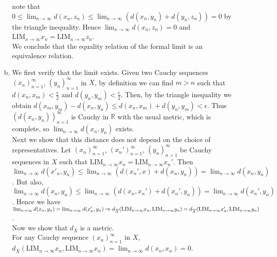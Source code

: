 \documentclass[A4paper,12pt]{article}
\theoremstyle{definition}
\numberwithin{equation}{section}
\begin{document}
\begin{enumerate}[(1)]
\begin{enumerate}[(a)]
                note that $0 \le \lim_{n \rightarrow \infty} d(x_n,z_n) \le \lim_{n \rightarrow \infty} (d(x_n, y_n)+ d(y_n, z_n)) = 0$ by the triangle inequality.
                Hence $\lim_{x  \rightarrow \infty } d(x_n, z_n)= 0$ and $\mathrm{LIM}_{x \rightarrow \infty} x_n  = \mathrm{LIM}_{n \rightarrow \infty} z_n$.
            \\We conclude that the equality relation of the formal limit is an equivalence relation.
            \item
                We first verify that the limit exists. 
                Given two Cauchy sequences $(x_n)_{n=1}^\infty$, $(y_n)_{n=1}^\infty$ in $X$, by definition we can find $m>n$ such that $d(x_n, x_m)<\frac{\epsilon}{2}$ and $d(y_n, y_m) < \frac{\epsilon}{2}$. 
                Then, by the triangle inequality we obtain $d(x_m,y_m) - d(x_n, y_n) \le d(x_n, x_m) + d(y_n, y_m) < \epsilon$. Thus $(d(x_n, y_n))_{n=1}^\infty$ is Cauchy in $\mathbb{R}$ with the usual metric, which is complete, so $\lim_{n\rightarrow \infty} d(x_n, y_n)$ exists.
                \\
                Next we show that this distance does not depend on the choice of representatives.
                Let $(x_n)_{n=1}^\infty$, $(x_n')_{n=1}^\infty$, $(y_n)_{n=1}^\infty$ be Cauchy sequences in $X$ such that
                $\mathrm{LIM}_{n \rightarrow \infty} x_n = \mathrm{LIM}_{n \rightarrow \infty} x_n'$. 
                Then $\lim_{n \rightarrow \infty} d(x'_n, y_n) \le  \lim_{n \rightarrow \infty}(d(x_n', x)+d(x_n, y_n)) = \lim_{n \rightarrow \infty}d(x_n, y_n)$.
                But also, $\lim_{n \rightarrow \infty} d(x_n, y_n) \le \lim_{n \rightarrow \infty}(d(x_n, x_n')+d(x_n', y_n)) = \lim_{n \rightarrow \infty} d(x_n', y_n)$. 
                Hence we have $\lim_{n \rightarrow \infty} d(x_n, y_n) = \lim_{n \rightarrow \infty} d(x'_n, y_n) \\ \Rightarrow d_{\overline{X}}(\mathrm{LIM}_{n \rightarrow \infty}x_n, \mathrm{LIM}_{n \rightarrow \infty}y_n) = d_{\overline{X}}(\mathrm{LIM}_{n \rightarrow \infty}x_n', \mathrm{LIM}_{n \rightarrow \infty}y_n)$.
                \\
                Now we show that $d_{\overline{X}}$ is a metric.\\
                For any Cauchy sequence $(x_n)_{n = 1}^\infty$ in $X$, $d_{\overline{X}}(\mathrm{LIM}_{n \rightarrow \infty} x_n, \mathrm{LIM}_{n \rightarrow \infty} x_n) = \lim_{n \rightarrow \infty} d(x_n, x_n) = 0$.
                \\

\end{enumerate}
\end{enumerate}
\end{document}
